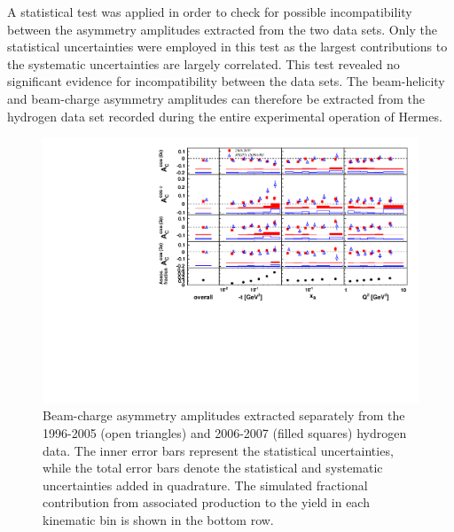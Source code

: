 A statistical test  was applied in order to check for possible incompatibility between the asymmetry amplitudes extracted from the two data sets. Only the statistical uncertainties were employed in this test as the largest contributions to the systematic uncertainties are largely correlated. This test revealed no significant evidence for incompatibility between the data sets. The beam-helicity and beam-charge asymmetry amplitudes can therefore be extracted from the  hydrogen data set recorded during the entire experimental operation of H{\sc ermes}.
\begin{figure}
\begin{center}
 \includegraphics[width=15cm,keepaspectratio]{macros/bca_both_morgan}
  \caption{Beam-charge asymmetry amplitudes extracted separately from the 1996-2005 (open triangles) and 2006-2007 (filled squares) hydrogen data.
The inner error bars represent the statistical uncertainties, while the total error bars denote the statistical and systematic uncertainties added in quadrature. The simulated fractional contribution from associated production to the yield in each kinematic bin is shown in the bottom row.}
 \label{release_bca_0607}
\end{center}
 \end{figure}

